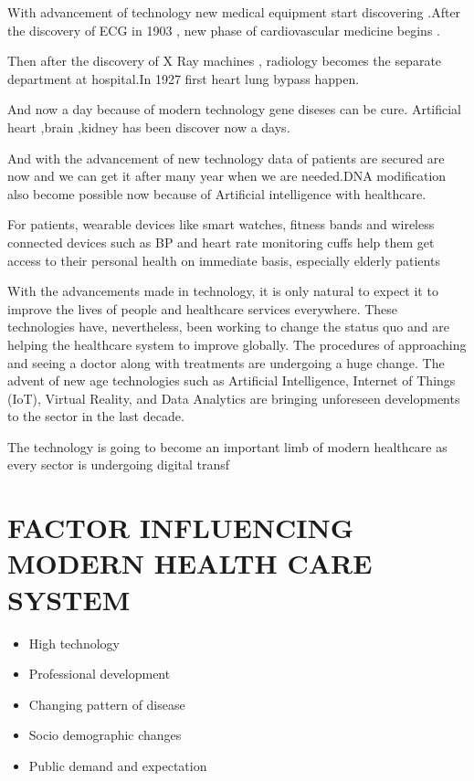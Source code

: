 \documentclass[12pt]{article}
\begin{document}
With advancement of technology new medical equipment start discovering .After the discovery of ECG in 1903 , new phase of cardiovascular medicine begins .

Then after the discovery of X Ray machines , radiology becomes the separate department at hospital.In 1927 first heart lung bypass happen.

And now a day because of modern technology gene diseses can be cure. Artificial heart ,brain ,kidney has been discover now a days.

And with the advancement of new technology data of patients are secured are now and we can get it after many year when we are needed.DNA modification also become possible now because of Artificial intelligence with healthcare.

For patients, wearable devices like smart watches, fitness bands and wireless connected devices such as BP and heart rate monitoring cuffs help them get access to their personal health on immediate basis, especially elderly patients

With the advancements made in technology, it is only natural to expect it to improve the lives of people and healthcare services everywhere. These technologies have, nevertheless, been working to change the status quo and are helping the healthcare system to improve globally. The procedures of approaching and seeing a doctor along with treatments are undergoing a huge change. The advent of new age technologies such as Artificial Intelligence, Internet of Things (IoT), Virtual Reality, and Data Analytics are bringing unforeseen developments to the sector in the last decade.

The technology is going to become an 
important limb of modern healthcare as every sector is undergoing digital transf

\flushleft\section{\large\textbf{FACTOR INFLUENCING MODERN HEALTH CARE SYSTEM}}

\begin{itemize}
\item High technology
\item Professional development
\item Changing pattern of disease
\item Socio demographic changes
\item Public demand and expectation
\end{itemize}
\end{document}

